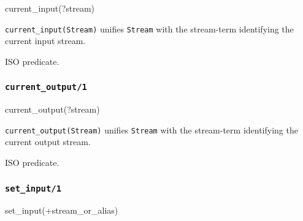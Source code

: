 \begin{TemplatesOneCol}
current\_input(?stream)

\end{TemplatesOneCol}

\Description

\texttt{current\_input(Stream)} unifies \texttt{Stream} with the stream-term
identifying the current input stream.

\begin{PlErrors}


\end{PlErrors}

\Portability

ISO predicate.

\subsubsection{\texttt{current\_output/1}}

\begin{TemplatesOneCol}
current\_output(?stream)

\end{TemplatesOneCol}

\Description

\texttt{current\_output(Stream)} unifies \texttt{Stream} with the
stream-term identifying the current output stream.

\begin{PlErrors}


\end{PlErrors}

\Portability

ISO predicate.

\subsubsection{\texttt{set\_input/1}}
\label{set-input/1}

\begin{TemplatesOneCol}
set\_input(+stream\_or\_alias)

\end{TemplatesOneCol}

\Description

